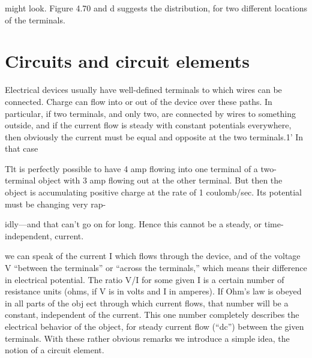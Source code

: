 might look. Figure 4.70 and d suggests the distribution, for two
different locations of the terminals.

\section{Circuits and circuit elements}

Electrical devices usually have well-defined terminals to which
wires can be connected. Charge can flow into or out of the device
over these paths. In particular, if two terminals, and only two, are
connected by wires to something outside, and if the current flow is
steady with constant potentials everywhere, then obviously the current
must be equal and opposite at the two terminals.1' In that case

Tlt is perfectly possible to have 4 amp flowing into one terminal of a two-terminal
object with 3 amp flowing out at the other terminal. But then the object is accumulating
positive charge at the rate of 1 coulomb/sec. Its potential must be changing very rap-

idly---and that can't go on for long. Hence this cannot be a steady, or time-independent,
current.

we can speak of the current I which flows through the device, and of
the voltage V ``between the terminals'' or ``across the terminals,''
which means their difference in electrical potential. The ratio V/I for
some given I is a certain number of resistance units (ohms, if V is in
volts and I in amperes). If Ohm's law is obeyed in all parts of the
obj ect through which current flows, that number will be a constant,
independent of the current. This one number completely describes
the electrical behavior of the object, for steady current flow (``dc'')
between the given terminals. With these rather obvious remarks we
introduce a simple idea, the notion of a circuit element.

